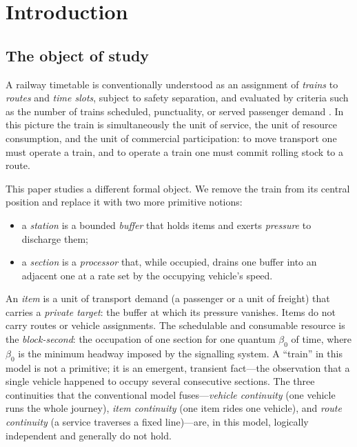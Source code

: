\documentclass[11pt,twocolumn,a4paper]{article}
\theoremstyle{definition}
\theoremstyle{remark}
\newcommand{\blocktime}{\beta_0}
\begin{document}
\tableofcontents

\section{Introduction}

\subsection{The object of study}

A railway timetable is conventionally understood as an assignment of \emph{trains} to \emph{routes} and \emph{time slots}, subject to safety separation, and evaluated by criteria such as the number of trains scheduled, punctuality, or served passenger demand \cite{caprara2002,cacchiani2012,hansen2008}. In this picture the train is simultaneously the unit of service, the unit of resource consumption, and the unit of commercial participation: to move transport one must operate a train, and to operate a train one must commit rolling stock to a route.

This paper studies a different formal object. We remove the train from its central position and replace it with two more primitive notions:

\begin{itemize}[nosep]
\item a \emph{station} is a bounded \emph{buffer} that holds items and exerts \emph{pressure} to discharge them;
\item a \emph{section} is a \emph{processor} that, while occupied, drains one buffer into an adjacent one at a rate set by the occupying vehicle's speed.
\end{itemize}

An \emph{item} is a unit of transport demand (a passenger or a unit of freight) that carries a \emph{private target}: the buffer at which its pressure vanishes. Items do not carry routes or vehicle assignments. The schedulable and consumable resource is the \emph{block-second}: the occupation of one section for one quantum $\blocktime$ of time, where $\blocktime$ is the minimum headway imposed by the signalling system. A ``train'' in this model is not a primitive; it is an emergent, transient fact---the observation that a single vehicle happened to occupy several consecutive sections. The three continuities that the conventional model fuses---\emph{vehicle continuity} (one vehicle runs the whole journey), \emph{item continuity} (one item rides one vehicle), and \emph{route continuity} (a service traverses a fixed line)---are, in this model, logically independent and generally do not hold.
\end{document}
